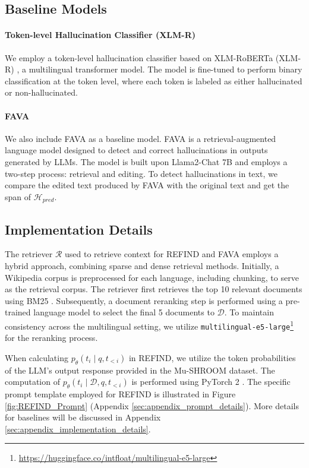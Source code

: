 \subsection{Baseline Models}

\paragraph{Token-level Hallucination Classifier (XLM-R)}
We employ a token-level hallucination classifier \cite{liu-etal-2022-token} based on XLM-RoBERTa (XLM-R) \cite{conneau-etal-2020-unsupervised}, a multilingual transformer model. 
The model is fine-tuned to perform binary classification at the token level, where each token is labeled as either hallucinated or non-hallucinated. 

\paragraph{FAVA}

We also include FAVA \cite{mishra2024finegrained-FAVA} as a baseline model. 
FAVA is a retrieval-augmented language model designed to detect and correct hallucinations in outputs generated by LLMs. 
The model is built upon Llama2-Chat 7B \cite{Touvron2023Llama2} and employs a two-step process: retrieval and editing.
To detect hallucinations in text, we compare the edited text produced by FAVA with the original text and get the span of $\mathcal{H}_{pred}$. 


\subsection{Implementation Details}

The retriever $\mathcal{R}$ used to retrieve context for REFIND and FAVA employs a hybrid approach, combining sparse and dense retrieval methods.  Initially, a Wikipedia corpus is preprocessed for each language, including chunking, to serve as the retrieval corpus. The retriever first retrieves the top 10 relevant documents using BM25 \cite{Robertson2009BM25}. Subsequently, a document reranking step is performed using a pre-trained language model to select the final 5 documents to $\mathcal{D}$. To maintain consistency across the multilingual setting, we utilize \texttt{multilingual-e5-large}\footnote{\url{https://huggingface.co/intfloat/multilingual-e5-large}} \cite{Wang2024multilingual-e5} for the reranking process.

When calculating $p_{\theta}(t_i \mid q, t_{<i})$ in REFIND, we utilize the token probabilities of the LLM's output response provided in the Mu-SHROOM dataset. The computation of $p_{\theta}(t_i \mid \mathcal{D}, q, t_{<i})$ is performed using PyTorch 2 \cite{Jason2024PyTorch2}. The specific prompt template employed for REFIND is illustrated in Figure \ref{fig:REFIND_Prompt} (Appendix \ref{sec:appendix_prompt_details}).
More details for baselines will be discussed in Appendix \ref{sec:appendix_implementation_details}.
